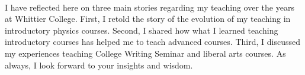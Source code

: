 \documentclass[../../../main.tex]{subfiles}
\begin{document}
\\
\vspace{0.25cm}
I have reflected here on three main stories regarding my teaching over the years at Whittier College.  First, I retold the story of the evolution of my teaching in introductory physics courses.  Second, I shared how what I learned teaching introductory courses has helped me to teach advanced courses.  Third, I discussed my experiences teaching College Writing Seminar and liberal arts courses.  As always, I look forward to your insights and wisdom.
\end{document}
